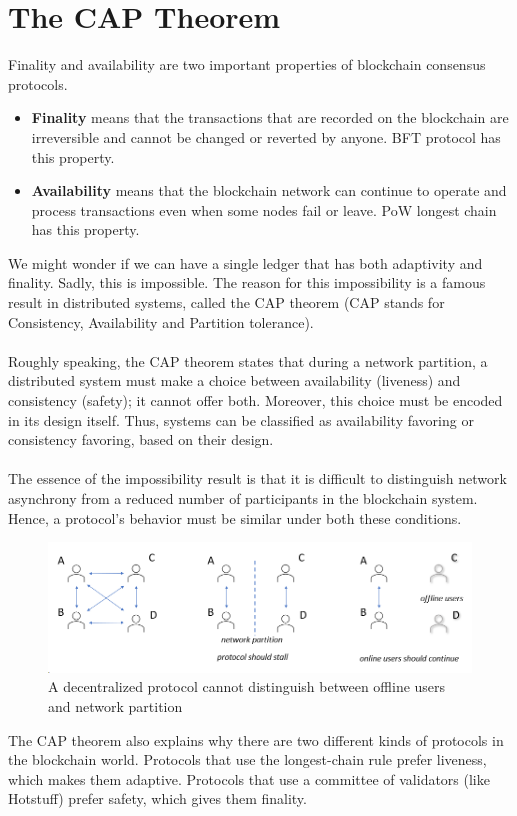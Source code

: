 	\section{The CAP Theorem}
	Finality and availability are two important properties of blockchain consensus protocols.
	\begin{itemize}
		\item \textbf{Finality} means that the transactions that are recorded on the blockchain are irreversible and cannot be changed or reverted by anyone. BFT protocol has this property.
		\item \textbf{Availability} means that the blockchain network can continue to operate and process transactions even when some nodes fail or leave. PoW longest chain has this property.
	\end{itemize}
	We might wonder if we can have a single ledger that has both adaptivity and finality. Sadly, this is impossible. The reason for this impossibility is a famous result in distributed systems, called the CAP theorem (CAP stands for Consistency, Availability and Partition tolerance).\\\\
	Roughly speaking, the CAP theorem states that during a network partition, a distributed system must make a choice between availability (liveness) and consistency (safety); it cannot offer both. Moreover, this choice must be encoded in its design itself.
	Thus, systems can be classified as availability favoring or consistency favoring, based on their design.\\\\
	The essence of the impossibility result is that it is difficult to distinguish network asynchrony from a reduced
	number of participants in the blockchain system. Hence, a protocol's behavior must be similar under both these conditions. 
	\begin{figure}[h!]
		\centering
		\includegraphics[width=0.6\linewidth]{Fig/17/F3}
		\caption{A decentralized protocol cannot distinguish between offline users and network partition
		}
		\label{fig:L17_f3}
	\end{figure}
	The CAP theorem also explains why there are two different kinds of protocols in the blockchain world. Protocols that use the longest-chain rule prefer liveness, which makes them adaptive. Protocols that use a committee of validators (like Hotstuff) prefer safety, which gives them finality.\\\\
